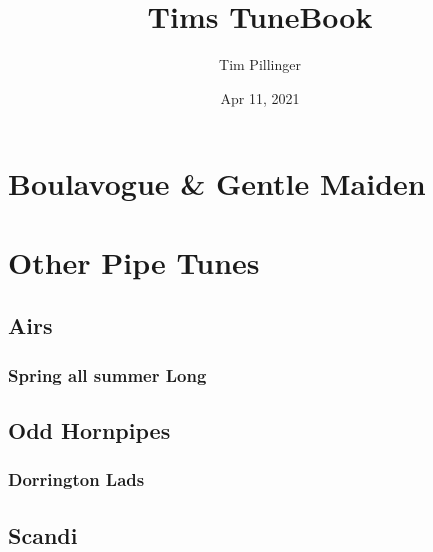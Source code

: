 \documentclass[letterpaper,10pt,english]{sphinxmanual}
\title{Tims TuneBook}
\date{Apr 11, 2021}
\author{Tim Pillinger}
\begin{document}
\pagestyle{empty}
\sphinxmaketitle
\pagestyle{plain}
\sphinxtableofcontents
\pagestyle{normal}
\label{\detokenize{index::doc}}



\chapter{Boulavogue \& Gentle Maiden}
\label{\detokenize{Piping Lessons/Boulavogue:boulavogue-gentle-maiden}}\label{\detokenize{Piping Lessons/Boulavogue::doc}}
\noindent{}

\noindent{}


\chapter{Other Pipe Tunes}
\label{\detokenize{Pipe Tunes/index:other-pipe-tunes}}\label{\detokenize{Pipe Tunes/index::doc}}

\section{Airs}
\label{\detokenize{Pipe Tunes/Spring all Summer Long:airs}}\label{\detokenize{Pipe Tunes/Spring all Summer Long::doc}}

\subsection{Spring all summer Long}
\label{\detokenize{Pipe Tunes/Spring all Summer Long:spring-all-summer-long}}
\noindent{}


\section{Odd Hornpipes}
\label{\detokenize{Pipe Tunes/Dorrington Lads:odd-hornpipes}}\label{\detokenize{Pipe Tunes/Dorrington Lads::doc}}

\subsection{Dorrington Lads}
\label{\detokenize{Pipe Tunes/Dorrington Lads:dorrington-lads}}
\noindent{}


\section{Scandi}
\label{\detokenize{Pipe Tunes/I'm not fed up with the Pacific Ocean:scandi}}\label{\detokenize{Pipe Tunes/I'm not fed up with the Pacific Ocean::doc}}
\end{document}
